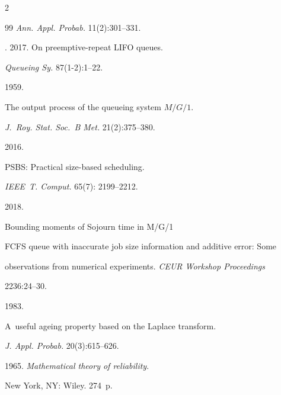 \begin{multicols}{2}
{{\begin{thebibliography}{99}
\textit{Ann. Appl. Probab.} 11(2):301--331.




. 2017. On preemptive-repeat LIFO queues. 

\textit{Queueing Sy.} 87(1-2):1--22.








 1959. 

The output process of the queueing system $M/G/1$. 

\textit{J.~Roy. Stat. Soc.~B Met.} 21(2):375--380.




 2016. 

\mbox{PSBS}: Practical size-based scheduling. 

\textit{IEEE~T. Comput.} 65(7): 2199--2212.






 2018.

Bounding moments of Sojourn time in M/G/1 

FCFS queue with inaccurate job size information and additive error: Some 

observations from numerical experiments. \textit{CEUR Workshop Proceedings} 

2236:24--30.






 1983.

A~useful ageing property based on the Laplace transform. 

\textit{J. Appl. Probab.} 20(3):615--626.




 1965. \textit{Mathematical theory of reliability}.

New York, NY: Wiley. 274~p.





\end{thebibliography}}}
\end{multicols}
